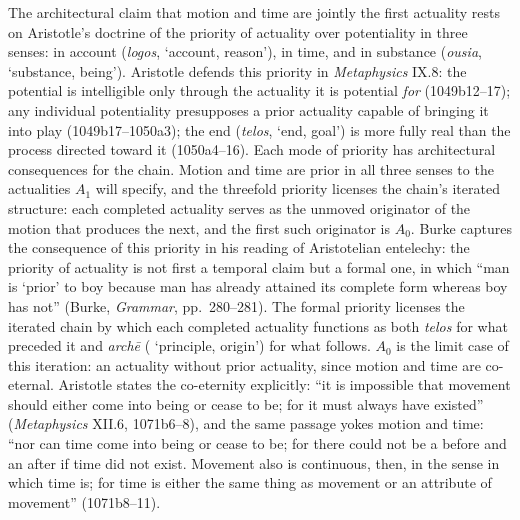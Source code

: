 The architectural claim that motion and time are jointly the first actuality rests on Aristotle's doctrine of the priority of actuality over potentiality in three senses: in account (\textit{logos},  `account, reason'), in time, and in substance (\textit{ousia},  `substance, being'). Aristotle defends this priority in \textit{Metaphysics} IX.8: the potential is intelligible only through the actuality it is potential \textit{for} (1049b12--17); any individual potentiality presupposes a prior actuality capable of bringing it into play (1049b17--1050a3); the end (\textit{telos},  `end, goal') is more fully real than the process directed toward it (1050a4--16). Each mode of priority has architectural consequences for the chain. Motion and time are prior in all three senses to the actualities $A_1$ will specify, and the threefold priority licenses the chain's iterated structure: each completed actuality serves as the unmoved originator of the motion that produces the next, and the first such originator is $A_0$. Burke captures the consequence of this priority in his reading of Aristotelian entelechy: the priority of actuality is not first a temporal claim but a formal one, in which ``man is `prior' to boy because man has already attained its complete form whereas boy has not'' (Burke, \textit{Grammar}, pp.~280--281). The formal priority licenses the iterated chain by which each completed actuality functions as both \textit{telos} for what preceded it and \textit{archē} ( `principle, origin') for what follows. $A_0$ is the limit case of this iteration: an actuality without prior actuality, since motion and time are co-eternal. Aristotle states the co-eternity explicitly: ``it is impossible that movement should either come into being or cease to be; for it must always have existed'' (\textit{Metaphysics} XII.6, 1071b6--8), and the same passage yokes motion and time: ``nor can time come into being or cease to be; for there could not be a before and an after if time did not exist. Movement also is continuous, then, in the sense in which time is; for time is either the same thing as movement or an attribute of movement'' (1071b8--11).

